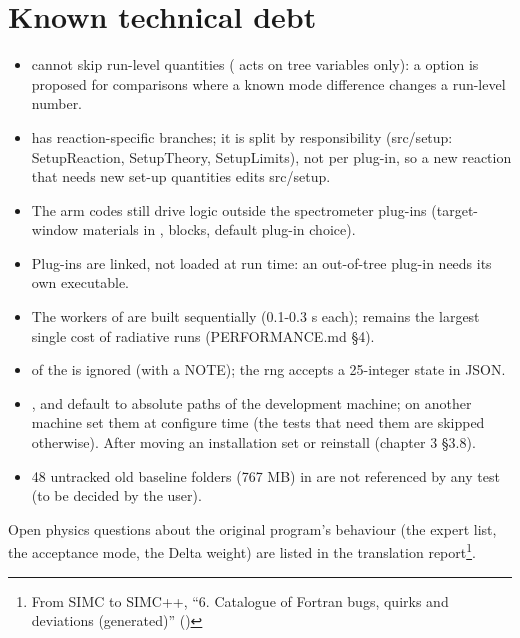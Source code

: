 \section{\texorpdfstring{Known technical debt}{Known technical debt}}\label{developer_manual-06u5fstandards:63-known-technical-debt}
\begin{itemize}
\item {} cannot skip run-level quantities ( acts on tree variables only): a  option is
proposed for comparisons where a known mode difference changes a run-level number.
\item {} has reaction-specific branches; it is split by responsibility (src/setup: SetupReaction,\allowbreak{} SetupTheory,\allowbreak{}
SetupLimits),\allowbreak{} not per plug-in, so a new reaction that needs new set-up quantities edits src/setup.
\item The arm codes still drive logic outside the spectrometer plug-ins (target-window materials in , 
blocks, default plug-in choice).
\item Plug-ins are linked, not loaded at run time: an out-of-tree plug-in needs its own executable.
\item The workers of  are built sequentially (0.1-0.3 s each);  remains the largest single cost of
radiative runs (PERFORMANCE.md §4).
\item {} of the  is ignored (with a NOTE); the  rng accepts a 25-integer state in JSON.
\item {},  and  default to absolute paths of the development machine;
on another machine set them at configure time (the tests that need them are skipped otherwise). After moving an
installation set  or reinstall (chapter 3 §3.8).
\item 48 untracked old baseline folders (767 MB) in  are not referenced by any test (to be
decided by the user).
\end{itemize}
Open physics questions about the original program's behaviour (the expert list, the acceptance mode, the Delta weight)
are listed in the translation report\footnote{From SIMC to SIMC++, ``6. Catalogue of Fortran bugs, quirks and deviations (generated)'' ()}.


